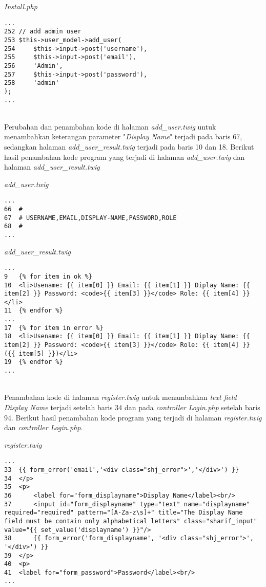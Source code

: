 \textit{Install.php}
\begin{lstlisting}[basicstyle=\ttfamily, frame=single,
columns=fullflexible, keepspaces=true, breaklines=true]
...
252	// add admin user
253	$this->user_model->add_user(
254		$this->input->post('username'),
255		$this->input->post('email'),
256		'Admin',
257		$this->input->post('password'),
258		'admin'
);
...
\end{lstlisting}
~\\ 
Perubahan dan penambahan kode di halaman \textit{add\_user.twig} untuk menambahkan keterangan parameter "\textit{Display Name}" terjadi pada baris 67, sedangkan halaman \textit{add\_user\_result.twig} terjadi pada baris 10 dan 18. Berikut hasil penambahan kode program yang terjadi di halaman \textit{add\_user.twig} dan halaman \textit{add\_user\_result.twig}

\textit{add\_user.twig}
\begin{lstlisting}[basicstyle=\ttfamily, frame=single,
columns=fullflexible, keepspaces=true, breaklines=true]
...
66	#
67	# USERNAME,EMAIL,DISPLAY-NAME,PASSWORD,ROLE
68	#
...
\end{lstlisting}

\textit{add\_user\_result.twig}
\begin{lstlisting}[basicstyle=\ttfamily, frame=single,
columns=fullflexible, keepspaces=true, breaklines=true]
...
9	{% for item in ok %}
10	<li>Usename: {{ item[0] }} Email: {{ item[1] }} Diplay Name: {{ item[2] }} Password: <code>{{ item[3] }}</code> Role: {{ item[4] }} </li>
11	{% endfor %}
...
17	{% for item in error %}
18	<li>Usename: {{ item[0] }} Email: {{ item[1] }} Diplay Name: {{ item[2] }} Password: <code>{{ item[3] }}</code> Role: {{ item[4] }} ({{ item[5] }})</li>
19	{% endfor %}
...
\end{lstlisting}
~\\
Penambahan kode di halaman \textit{register.twig} untuk menambahkan \textit{text field Display Name} terjadi setelah baris 34 dan pada \textit{controller Login.php} setelah baris 94. Berikut hasil penambahan kode program yang terjadi di halaman \textit{register.twig} dan \textit{controller Login.php}.

\textit{register.twig}
\begin{lstlisting}[basicstyle=\ttfamily, frame=single,
columns=fullflexible, keepspaces=true, breaklines=true]
...
33	{{ form_error('email','<div class="shj_error">','</div>') }}
34	</p>
35	<p>
36		<label for="form_displayname">Display Name</label><br/>
37		<input id="form_displayname" type="text" name="displayname" required="required" pattern="[A-Za-z\s]+" title="The Display Name field must be contain only alphabetical letters" class="sharif_input" value="{{ set_value('displayname') }}"/>
38		{{ form_error('form_displayname', '<div class="shj_error">', '</div>') }}
39	</p>
40	<p>
41	<label for="form_password">Password</label><br/>
...
\end{lstlisting}

